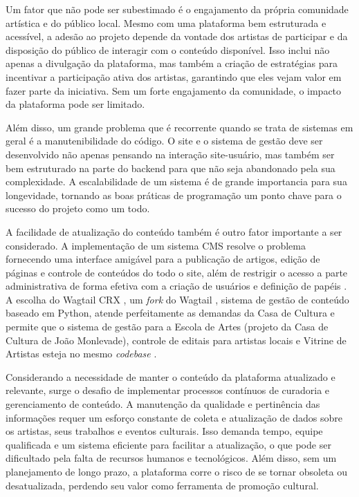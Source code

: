 Um fator que não pode ser subestimado é o engajamento da própria comunidade artística e do público local. Mesmo com uma plataforma bem estruturada e acessível, a adesão ao projeto depende da vontade dos artistas de participar e da disposição do público de interagir com o conteúdo disponível. Isso inclui não apenas a divulgação da plataforma, mas também a criação de estratégias para incentivar a participação ativa dos artistas, garantindo que eles vejam valor em fazer parte da iniciativa. Sem um forte engajamento da comunidade, o impacto da plataforma pode ser limitado.

Além disso, um grande problema que é recorrente quando se trata de sistemas em geral é a manutenibilidade do código. O site e o sistema de gestão deve ser desenvolvido não apenas pensando na interação site-usuário, mas também ser bem estruturado na parte do backend para que não seja abandonado pela sua complexidade. A escalabilidade de um sistema é de grande importancia para sua longevidade, tornando as boas práticas de programação um ponto chave para o sucesso do projeto como um todo.

A facilidade de atualização do conteúdo também é outro fator importante a ser considerado. A implementação de um sistema \ac{CMS} resolve o problema fornecendo uma interface amigável para a publicação de artigos, edição de páginas e controle de conteúdos do todo o site, além de restrigir o acesso a parte administrativa de forma efetiva com a criação de usuários e definição de papéis \cite{Baker2013}. A escolha do Wagtail CRX \cite{WagtailCRX}, um \textit{fork} do Wagtail \cite{Wagtail}, sistema de gestão de conteúdo baseado em Python, atende perfeitamente as demandas da Casa de Cultura e permite que o sistema de gestão para a Escola de Artes (projeto da Casa de Cultura de João Monlevade), controle de editais para artistas locais e Vitrine de Artistas esteja no mesmo \textit{codebase} .

Considerando a necessidade de manter o conteúdo da plataforma atualizado e relevante, surge o desafio de implementar processos contínuos de curadoria e gerenciamento de conteúdo. A manutenção da qualidade e pertinência das informações requer um esforço constante de coleta e atualização de dados sobre os artistas, seus trabalhos e eventos culturais. Isso demanda tempo, equipe qualificada e um sistema eficiente para facilitar a atualização, o que pode ser dificultado pela falta de recursos humanos e tecnológicos. Além disso, sem um planejamento de longo prazo, a plataforma corre o risco de se tornar obsoleta ou desatualizada, perdendo seu valor como ferramenta de promoção cultural.

